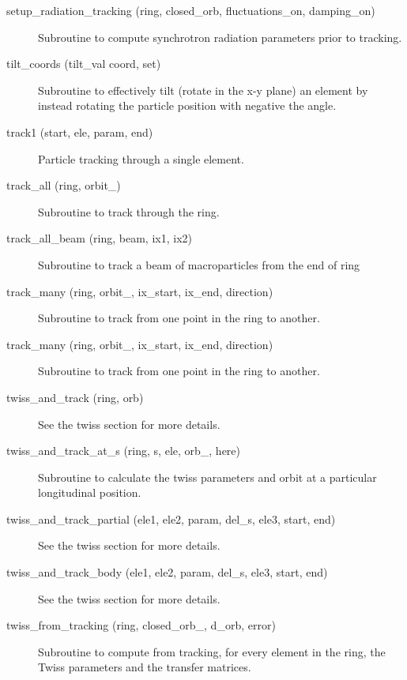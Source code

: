 \begin{description}
\item[setup\_radiation\_tracking (ring, closed\_orb, fluctuations\_on, damping\_on)] \Newline
Subroutine to compute synchrotron radiation parameters prior to tracking. 

\item[tilt\_coords (tilt\_val coord, set)] \Newline
Subroutine to effectively tilt (rotate in the x-y plane) an element by 
instead rotating the particle position with negative the angle. 

\item[track1 (start, ele, param, end)] \Newline
Particle tracking through a single element. 

\item[track\_all (ring, orbit\_)] \Newline
Subroutine to track through the ring. 

\item[track\_all\_beam (ring, beam, ix1, ix2)] \Newline 
     Subroutine to track a beam of macroparticles from the end of
     ring%

\item[track\_many (ring, orbit\_, ix\_start, ix\_end, direction)] \Newline
Subroutine to track from one point in the ring to another. 

\item[track\_many (ring, orbit\_, ix\_start, ix\_end, direction)] \Newline
Subroutine to track from one point in the ring to another. 

\item[twiss\_and\_track (ring, orb)] \Newline
See the twiss section for more details. 

\item[twiss\_and\_track\_at\_s (ring, s, ele, orb\_, here)] \Newline
Subroutine to calculate the twiss parameters and orbit at a particular longitudinal position. 

\item[twiss\_and\_track\_partial (ele1, ele2, param, del\_s, ele3, start, end)] \Newline
See the twiss section for more details. 

\item[twiss\_and\_track\_body (ele1, ele2, param, del\_s, ele3, start, end)] \Newline
See the twiss section for more details. 

\item[twiss\_from\_tracking (ring, closed\_orb\_, d\_orb, error)] \Newline
Subroutine to compute from tracking, for every element in the ring, 
the Twiss parameters and the transfer matrices. 

\end{description}

